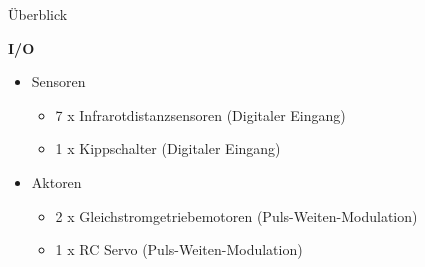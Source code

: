 \documentclass{beamer}
\begin{document}
\begin{frame}{\"Uberblick}
\begin{large}\textbf{I/O}\end{large}
\begin{itemize}
	\item Sensoren
	\begin{itemize}
		\item 7 x Infrarotdistanzsensoren (Digitaler Eingang)
		\item 1 x Kippschalter (Digitaler Eingang)
	\end{itemize}
	\item Aktoren
	\begin{itemize}
		\item 2 x Gleichstromgetriebemotoren (Puls-Weiten-Modulation)
		\item 1 x RC Servo (Puls-Weiten-Modulation)
	\end{itemize}
\end{itemize}
\end{frame}
\end{document}
